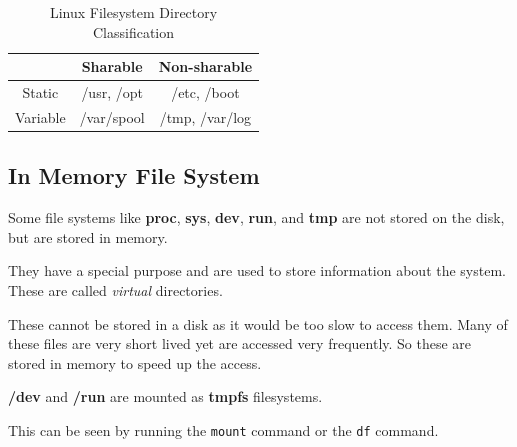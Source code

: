 \begin{table}[h!]
\caption{Linux Filesystem Directory Classification}
\begin{tabular}{ c | c c }
  \toprule
  & Sharable & Non-sharable \\
 \midrule
  Static & /usr, /opt & /etc, /boot \\
  Variable & /var/spool & /tmp, /var/log \\
 \bottomrule
\end{tabular}
\end{table}

\subsection{In Memory File System}

Some file systems like \textbf{proc}, \textbf{sys}, \textbf{dev}, \textbf{run}, and \textbf{tmp} are not stored on the disk, but are stored in memory.

They have a special purpose and are used to store information about the system.
These are called \textit{virtual} directories.

These cannot be stored in a disk as it would be too slow to access them.
Many of these files are very short lived yet are accessed very frequently.
So these are stored in memory to speed up the access.

\textbf{/dev} and \textbf{/run} are mounted as \textbf{tmpfs} filesystems.

This can be seen by running the \texttt{mount} command or the \texttt{df} command.

